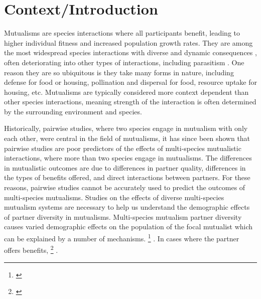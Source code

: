 \documentclass[12pt,a4paper]{article}
\newcommand{\ali}[2]{{\color{pink}{#1}}\footnote{\textit{\color{pink}{#2}}}}
\begin{document}
\section*{Context/Introduction}

Mutualisms are species interactions where all participants benefit, leading to higher individual fitness and increased population growth rates. 
They are among the most widespread species interactions\cite{Chamberlain2014, BoucherDouglasH.1985} with diverse and dynamic consequences \cite{Bronstein1994,Chamberlain2014,Frederickson2013}, often deteriorating into other types of interactions, including parasitism \cite{Rodriguez-Rodriguez2017,Song2020,Mandyam2014,Thrall2007, Bahia2022}.
One reason they are so ubiquitous is they take many forms in nature, including defense for food or housing\cite{Willmer1997}, pollination and dispersal for food\cite{Sakai2002,Burns2004}, resource uptake for housing\cite{Holland2010}, etc. 
Mutualisms are typically considered more context dependent than other species interactions\cite{Chamberlain2014,Frederickson2013}, meaning strength of the interaction is often determined by the surrounding environment and species. 

Historically, pairwise studies, where two species engage in mutualism with only each other, were central in the field of mutualisms, it has since been shown that pairwise studies are poor predictors of the effects of multi-species mutualistic interactions\cite{Afkhami2014,Palmer2010}, where more than two species engage in mutualisms.
The differences in mutualistic outcomes are due to differences in partner quality\cite{Bascompte2019,Stanton2013,Frederickson2013,Jones2015, Ness2006}, differences in the types of benefits offered\cite{Kiers2003,Afkhami2014}, and direct interactions between partners\cite{Sun2019,Heath2009,Heath2014,Grutter2003}.
For these reasons, pairwise studies cannot be accurately used to predict the outcomes of multi-species mutualisms\cite{Palmer2010, Stanton2013, Chamberlain2014, Song2020}.
Studies on the effects of diverse multi-species mutualism systems are necessary to help us understand the demographic effects of partner diversity in mutualisms\cite{Bascompte2019}. 
Multi-species mutualism partner diversity causes varied demographic effects on the population of the focal mutualist which can be explained by a number of mechanisms.
\ali{In some cases, the quality of the benefits offered varies leading to some partners which benefit the individual, some which have neither a positive or negative impact on the individual, and some which negatively impact the host}{Is this the best way to introduce this or should I talk about quality of benefits compared to cost of rewards? AKA some partners offer a net benefit when the benefits outweigh the cost of rewards to the partner ... etc.} \cite{Bronstein1994,Bronstein2001a,Afkhami2014,Song2020,West2007,Frederickson2013,Jones2015}. In cases where the partner offers benefits, \ali{the function, or type of benefits, offered by the partner can vary}{Is this enough detail or do I need to go into examples?} \cite{Stanton2003}.
\end{document}
